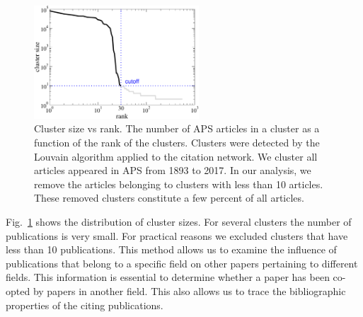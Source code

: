\documentclass[draft,final]{vutinfth} %
\begin{document}
%
\begin{figure}[b]
    \centering
    \includegraphics[width=0.55\textwidth]{figures_exaptation/clustersize.pdf}
    \caption{Cluster size vs rank.
    The number of APS articles in a cluster as a function of  the rank of the clusters.
    Clusters were detected by the Louvain algorithm applied to the citation network. 
    We cluster all articles appeared in APS from 1893 to 2017. 
    In our analysis, we remove the articles belonging to clusters with less than 10 articles. 
    These removed clusters constitute a few percent of all articles.}
    \label{fig:cluster_sizes}
\end{figure}
%
Fig.~\ref{fig:cluster_sizes} shows the distribution of cluster sizes. For several clusters the number of publications is very small. For practical reasons we excluded clusters that have less than 10 publications. This method allows us to examine the influence of publications that belong to a specific field on other papers pertaining to different fields. This information is essential to determine whether a paper has been co-opted by papers in another field. This also allows us to trace the bibliographic properties of the citing publications.
%
\end{document}
